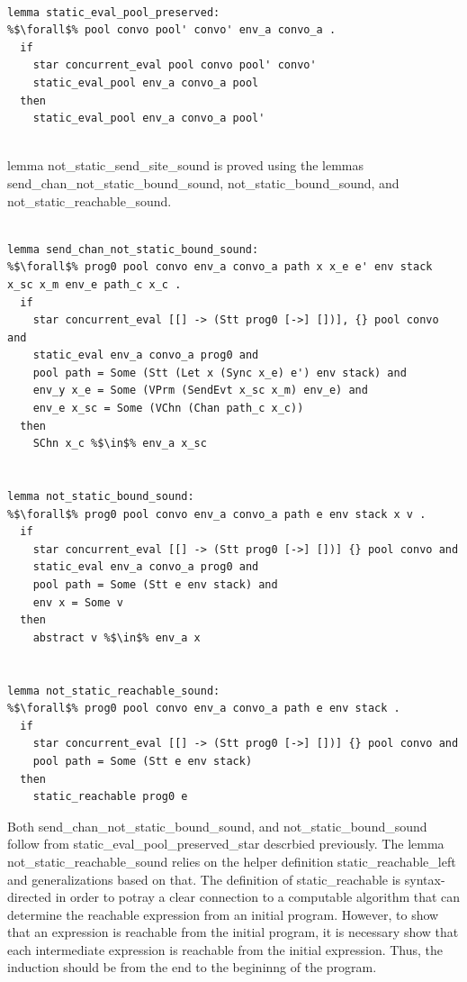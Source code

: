 \documentclass{article}
\begin{document}
\begin{lstlisting}[language=logic, escapechar=\%]

lemma static_eval_pool_preserved:
%$\forall$% pool convo pool' convo' env_a convo_a .
  if
    star concurrent_eval pool convo pool' convo' 
    static_eval_pool env_a convo_a pool
  then
    static_eval_pool env_a convo_a pool'


\end{lstlisting}

lemma not\_static\_send\_site\_sound is proved using the lemmas   
send\_chan\_not\_static\_bound\_sound, not\_static\_bound\_sound, and
not\_static\_reachable\_sound.

\begin{lstlisting}[language=logic, escapechar=\%]

lemma send_chan_not_static_bound_sound:
%$\forall$% prog0 pool convo env_a convo_a path x x_e e' env stack x_sc x_m env_e path_c x_c .
  if
    star concurrent_eval [[] -> (Stt prog0 [->] [])], {} pool convo and
    static_eval env_a convo_a prog0 and
    pool path = Some (Stt (Let x (Sync x_e) e') env stack) and
    env_y x_e = Some (VPrm (SendEvt x_sc x_m) env_e) and
    env_e x_sc = Some (VChn (Chan path_c x_c))
  then
    SChn x_c %$\in$% env_a x_sc


lemma not_static_bound_sound:
%$\forall$% prog0 pool convo env_a convo_a path e env stack x v .
  if
    star concurrent_eval [[] -> (Stt prog0 [->] [])] {} pool convo and
    static_eval env_a convo_a prog0 and 
    pool path = Some (Stt e env stack) and 
    env x = Some v
  then
    abstract v %$\in$% env_a x


lemma not_static_reachable_sound:
%$\forall$% prog0 pool convo env_a convo_a path e env stack .
  if
    star concurrent_eval [[] -> (Stt prog0 [->] [])] {} pool convo and
    pool path = Some (Stt e env stack)
  then
    static_reachable prog0 e

\end{lstlisting}


Both send\_chan\_not\_static\_bound\_sound, and not\_static\_bound\_sound follow from
static\_eval\_pool\_preserved\_star descrbied previously.
The lemma not\_static\_reachable\_sound relies on the helper definition static\_reachable\_left
and generalizations based on that.
The definition of static\_reachable is syntax-directed in order to potray a clear connection to
a computable algorithm that can determine the reachable expression from an initial program.
However, to show that an expression is reachable from the initial program, it is necessary
show that each intermediate expression is reachable from the initial expression.  Thus, the
induction should be from the end to the begininng of the program.
\end{document}
